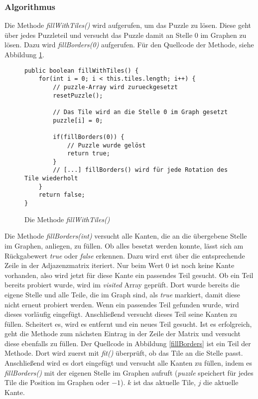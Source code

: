 \documentclass[a4paper, 12pt]{scrartcl}
\begin{document}
\subsubsection{Algorithmus}

Die Methode \emph{fillWithTiles()} wird aufgerufen, um das Puzzle zu lösen. Diese geht über jedes Puzzleteil und versucht das Puzzle damit an Stelle $0$ im Graphen zu lösen. Dazu wird \emph{fillBorders(0)} aufgerufen. Für den Quellcode der Methode, siehe Abbildung \ref{fillWithTiles}.

\begin{figure}[h]
    \centering

\begin{lstlisting}
public boolean fillWithTiles() {
	for(int i = 0; i < this.tiles.length; i++) {
		// puzzle-Array wird zurueckgesetzt
		resetPuzzle();

        // Das Tile wird an die Stelle 0 im Graph gesetzt
        puzzle[i] = 0;
		
        if(fillBorders(0)) {
            // Puzzle wurde gelöst
            return true;
        }
        // [...] fillBorders() wird für jede Rotation des Tile wiederholt
    }
	return false;
}
\end{lstlisting}

    \caption{Die Methode \emph{fillWithTiles()}}
    \label{fillWithTiles}
\end{figure}

Die Methode \emph{fillBorders(int)} versucht alle Kanten, die an die übergebene Stelle im Graphen, anliegen, zu füllen. Ob alles besetzt werden konnte, lässt sich am Rückgabewert \emph{true} oder \emph{false} erkennen. Dazu wird erst über die entsprechende Zeile in der Adjazenzmatrix iteriert. Nur beim Wert $0$ ist noch keine Kante vorhanden, also wird jetzt für diese Kante ein passendes Teil gesucht. Ob ein Teil bereits probiert wurde, wird im \emph{visited} Array geprüft. Dort wurde bereits die eigene Stelle und alle Teile, die im Graph sind, als \emph{true} markiert, damit diese nicht erneut probiert werden. Wenn ein passendes Teil gefunden wurde, wird dieses vorläufig eingefügt. Anschließend versucht dieses Teil seine Kanten zu füllen. Scheitert es, wird es entfernt und ein neues Teil gesucht. Ist es erfolgreich, geht die Methode zum nächsten Eintrag in der Zeile der Matrix und versucht diese ebenfalls zu füllen. Der Quellcode in Abbildung \ref{fillBorders} ist ein Teil der Methode. Dort wird zuerst mit \emph{fit()} überprüft, ob das Tile an die Stelle passt. Anschließend wird es dort eingefügt und versucht alle Kanten zu füllen, indem es \emph{fillBorders()} mit der eigenen Stelle im Graphen aufruft (\emph{puzzle} speichert für jedes Tile die Position im Graphen oder $-1$). $k$ ist das aktuelle Tile, $j$ die aktuelle Kante.
\end{document}
